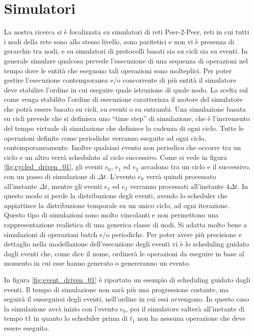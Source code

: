 \section{Simulatori}
\label{sec:simulatori}

La nostra ricerca si è focalizzata su simulatori di reti Peer-2-Peer, reti in cui tutti i nodi della rete sono allo stesso livello, sono paritetici e non vi è presenza di gerarchie tra nodi, e su simulatori di protocolli basati sia su cicli sia su eventi. In generale simulare qualcosa prevede l'esecuzione di una sequenza di operazioni nel tempo dove le entità che eseguono tali operazioni sono molteplici. Per poter gestire l'esecuzione contemporanea e/o concorrente di più entità il simulatore deve stabilire l'ordine in cui eseguire quale istruzione di quale nodo. La scelta sul come venga stabilito l'ordine di esecuzione caratterizza il motore del simulatore che potrà essere basato su cicli, su eventi o su entrambi. Una simulazione basata su cicli prevede che si definisca uno “time step” di simulazione, che è l'incremento del tempo virtuale di simulazione che definisce la cadenza di ogni ciclo. Tutte le operazioni definite come periodiche verranno eseguite ad ogni ciclo, contemporaneamente. Inoltre qualsiasi evento non periodico che occorre tra un ciclo e un altro verrà schedulato al ciclo successivo. Come si vede in figura \ref{fig:cycled_driven_01}, gli eventi $e_0$, $e_1$ ed $e_2$ accadono tra un ciclo e il successivo, con un passo di simulazione di $\Delta t$. L'evento $e_0$ verrà quindi processato all'instante $\Delta t$, mentre gli eventi $e_1$ ed $e_2$ verranno processati all'instante $4\Delta t$. In questo modo si perde la distribuzione degli eventi, avendo lo scheduler che appiattisce la distribuzione temporale su un unico ciclo, ad ogni iterazione. Questo tipo di simulazioni sono molto vincolanti e non permettono una rappresentazione realistica di una generica classe di nodi. Si adatta molto bene a simulazioni di operazioni batch e/o periodiche. Per poter avere più precisione e dettaglio nella modellazione dell'esecuzione degli eventi vi è lo scheduling guidato dagli eventi che, come dice il nome, ordinerà le operazioni da eseguire in base al momento in cui esse hanno generato o genereranno un evento.

In figura \ref{fig:event_driven_01} è riportato un esempio di scheduling guidato dagli eventi. Il tempo di simulazione non sarà più una progressione costante, ma seguirà il susseguirsi degli eventi, nell'ordine in cui essi avvengono. In questo caso la simulazione avrà inizio con l'evento $e_0$, poi il simulatore salterà all'instante di tempo t1 in quanto lo scheduler prima di $t_1$ non ha nessuna operazione che deve essere eseguita.

